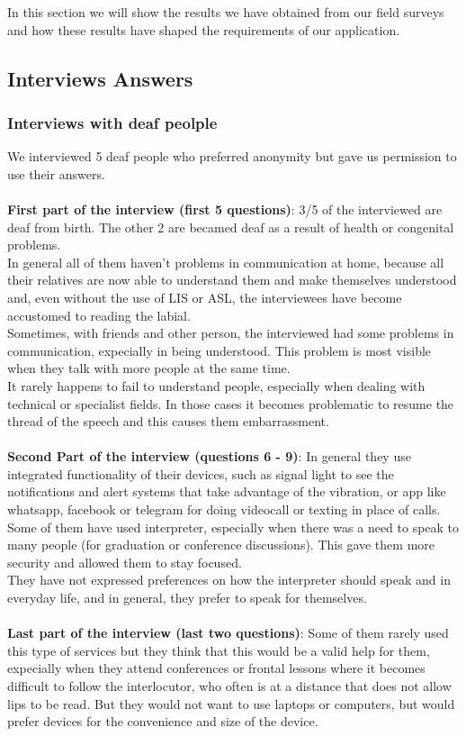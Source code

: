 \lhead{}
In this section we will show the results we have obtained from our field surveys and how these results have shaped the requirements of our application.

\subsection{Interviews Answers}
\subsubsection{Interviews with deaf peolple}
We interviewed 5 deaf people who preferred anonymity but gave us permission to use their answers.
 \\ \\
\textbf{First part of the interview (first 5 questions)}: 
3/5 of the interviewed are deaf from birth. The other 2 are becamed deaf as a result of health or congenital problems. \\
In general all of them haven't problems in communication at home, because all their relatives are now able to understand them and make themselves understood and, even without the use of LIS or ASL, the interviewees have become accustomed to reading the labial. \\
Sometimes, with friends and other person, the interviewed had some problems in communication, expecially in being understood. This problem is most visible when they talk with more people at the same time.\\
It rarely happens to fail to understand people, especially when dealing with technical or specialist fields. In those cases it becomes problematic to resume the thread of the speech and this causes them embarrassment.
\\ \\
\textbf{Second Part of the interview (questions 6 - 9)}:
In general they use integrated functionality of their devices, such as signal light to see the notifications and alert systems that take advantage of the vibration, or app like whatsapp, facebook or telegram for doing videocall or texting in place of calls.\\
Some of them have used interpreter, especially when there was a need to speak to many people (for graduation or conference discussions). This gave them more security and allowed them to stay focused. \\
They have not expressed preferences on how the interpreter should speak and in everyday life, and in general, they prefer to speak for themselves.
\\ \\
\textbf{Last part of the interview (last two questions)}:
Some of them rarely used this type of services but they think that this would be a valid help for them, expecially when they attend conferences or frontal lessons where it becomes difficult to follow the interlocutor, who often is at a distance that does not allow lips to be read. But they would not want to use laptops or computers, but would prefer devices for the convenience and size of the device. 
\clearpage
